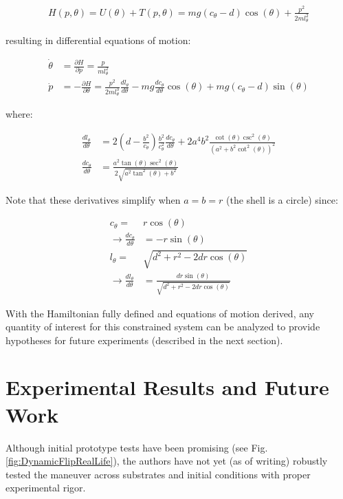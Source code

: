 \documentclass[letterpaper]{report}
\begin{document}
\begin{align}
  H(p,\theta) = U(\theta) + T(p,\theta) = mg(c_\theta - d) \cos(\theta) + \frac{p^2}{2ml_\theta^2}
\end{align}

resulting in differential equations of motion:

\begin{align}
  \dot{\theta} &=  \frac{\partial H}{\partial p} = \frac{p}{ml_\theta^2} \\
  \dot{p} &= - \frac{\partial H}{\partial \theta} = \frac{p^2}{2 m l_\theta^3} \frac{dl_\theta}{d\theta} - mg \frac{dc_\theta}{d\theta} \cos(\theta) + mg (c_\theta - d) \sin(\theta)
\end{align}

where:

\begin{align}
  \frac{d l_\theta}{d\theta} &= 2 \left(d - \frac{b^2}{c_\theta} \right) \frac{b^2}{c_\theta^2} \frac{d c_\theta}{d\theta} + 2a^4 b^2 \frac{\cot(\theta) \csc^2(\theta)}{(a^2 + b^2 \cot^2(\theta))^2} \\
  \frac{d c_\theta}{d\theta} &= \frac{a^2 \tan(\theta) \sec^2(\theta)}{2 \sqrt{a^2 \tan^2(\theta) + b^2}}
\end{align}

Note that these derivatives simplify when $a = b = r$ (the shell is a circle) since:

\begin{align}
  c_\theta = & r \cos(\theta) \\
  \rightarrow \frac{d c_\theta}{d\theta} &= -r \sin(\theta)\\
  l_\theta = & \sqrt{d^2 + r^2 - 2 d r \cos(\theta)} \\
  \rightarrow \frac{d l_\theta}{d\theta} &= \frac{d r \sin(\theta)}{ \sqrt{d^2 + r^2 - 2 d r \cos(\theta)} }
\end{align}

With the Hamiltonian fully defined and equations of motion derived, any quantity of interest for this constrained system can be analyzed to provide hypotheses for future experiments (described in the next section).

\section{Experimental Results and Future Work}
Although initial prototype tests have been promising (see Fig. \ref{fig:DynamicFlipRealLife}), the authors have not yet (as of writing) robustly tested the maneuver across substrates and initial conditions with proper experimental rigor.
\end{document}
